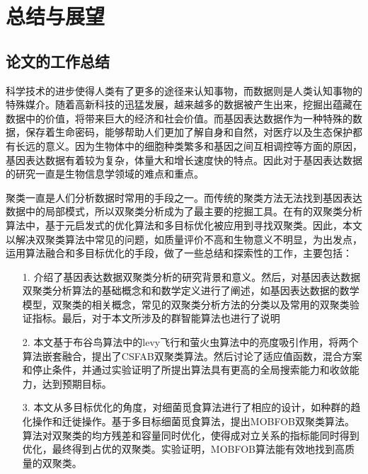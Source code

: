 \chapter{总结与展望}
\section{论文的工作总结}
科学技术的进步使得人类有了更多的途径来认知事物，而数据则是人类认知事物的特殊媒介。随着高新科技的迅猛发展，越来越多的数据被产生出来，挖掘出蕴藏在数据中的价值，将带来巨大的经济和社会价值。而基因表达数据作为一种特殊的数据，保存着生命密码，能够帮助人们更加了解自身和自然，对医疗以及生态保护都有长远的意义。因为生物体中的细胞种类繁多和基因之间互相调控等方面的原因，基因表达数据有着较为复杂，体量大和增长速度快的特点。因此对于基因表达数据的研究一直是生物信息学领域的难点和重点。

聚类一直是人们分析数据时常用的手段之一。而传统的聚类方法无法找到基因表达数据中的局部模式，所以双聚类分析成为了最主要的挖掘工具。在有的双聚类分析算法中，基于元启发式的优化算法和多目标优化被应用到寻找双聚类。因此，本文以解决双聚类算法中常见的问题，如质量评价不高和生物意义不明显，为出发点，运用算法融合和多目标优化的手段，做了一些总结和探索性的工作，主要包括：
\begin{itemize}
    \item[1.]{介绍了基因表达数据双聚类分析的研究背景和意义。然后，对基因表达数据双聚类分析算法的基础概念和和数学定义进行了阐述，如基因表达数据的数学模型，双聚类的相关概念，常见的双聚类分析方法的分类以及常用的双聚类验证指标。最后，对于本文所涉及的群智能算法也进行了说明}  

    \item[2.]{本文基于布谷鸟算法中的levy飞行和萤火虫算法中的亮度吸引作用，将两个算法嵌套融合，提出了CSFAB双聚类算法。然后讨论了适应值函数，混合方案和停止条件，并通过实验证明了所提出算法具有更高的全局搜索能力和收敛能力，达到预期目标。}

    \item[3.]{本文从多目标优化的角度，对细菌觅食算法进行了相应的设计，如种群的趋化操作和迁徙操作。基于多目标细菌觅食算法，提出MOBFOB双聚类算法。算法对双聚类的均方残差和容量同时优化，使得成对立关系的指标能同时得到优化，最终得到占优的双聚类。实验证明，MOBFOB算法能有效地找到高质量的双聚类。}
    
\end{itemize}

